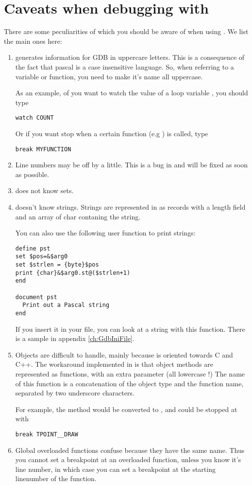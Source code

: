 \documentclass{report}
\begin{document}
\section{Caveats when debugging with }
There are some peculiarities of \fpc which you should be aware of when using
. We list the main ones here:
\begin{enumerate}
\item \fpc generates information for GDB in uppercare letters. This is a
consequence of the fact that pascal is a case insensitive language. So, when
referring to a variable or function, you need to make it's name all
uppercase.

As an example, of you want to watch the value of a loop variable
, you should type
\begin{verbatim}
watch COUNT
\end{verbatim}
Or if you want stop when a certain function (e.g ) is called, 
type
\begin{verbatim}
break MYFUNCTION
\end{verbatim}

\item Line numbers may be off by a little. This is a bug in \fpc and will be
fixed as soon as possible.

\item {} does not know sets.

\item {} doesn't know strings. Strings are represented in  
as records with a length field and an array of char contaning the string.

You can also use the following user function to print strings:
\begin{verbatim}
define pst
set $pos=&$arg0
set $strlen = {byte}$pos
print {char}&$arg0.st@($strlen+1)
end

document pst
  Print out a Pascal string
end 
\end{verbatim}
If you insert it in your  file, you can look at a string with this
function. There is a sample  in appendix \ref{ch:GdbIniFile}.


\item Objects are difficult to handle, mainly because  is oriented
towards C and C++. The workaround implemented in \fpc is that object methods
are represented as functions, with an extra parameter  (all
lowercase !) The name of this function is a concatenation of the object type
and the function name, separated by two underscore characters.


For example, the method  would be converted to
, and could be stopped at with
\begin{verbatim}
break TPOINT__DRAW
\end{verbatim}

\item Global overloaded functions confuse  because they have the same
name. Thus you cannot set a breakpoint at an overloaded function, unless you
know it's line number, in which case you can set a breakpoint at the
starting linenumber of the function.
\end{enumerate}
\end{document}

